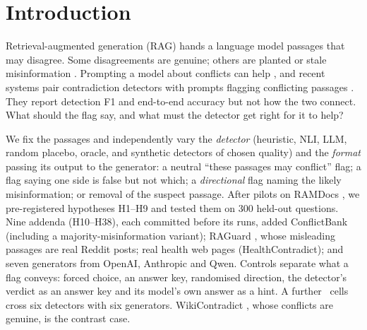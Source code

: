 \section{Introduction}

Retrieval-augmented generation (RAG) \citep{lewis2020rag} hands a language model passages that may disagree. Some
disagreements are genuine; others are planted or stale misinformation \citep{zou2025poisonedrag,wang2025madam}. Prompting a model about conflicts can help \citep{cattan2025conflicts}, and recent systems pair contradiction
detectors with prompts flagging conflicting passages \citep{wang2026conflictrag}. They report detection F1 and end-to-end accuracy but not how the two connect. What should the flag say, and what must the
detector get right for it to help?

We fix the passages and independently vary the \emph{detector} (heuristic, NLI, LLM, random placebo,
oracle, and synthetic detectors of chosen quality) and the \emph{format} passing its output to the generator: a
neutral ``these passages may conflict'' flag; a flag saying one side is false but not which; a
\emph{directional} flag naming the likely misinformation; or removal of the suspect passage. After pilots on
RAMDocs \citep{wang2025madam}, we pre-registered hypotheses H1--H9 and tested them on 300 held-out questions.
Nine addenda (H10--H38), each committed before its runs, added ConflictBank \citep{su2024conflictbank}
(including a majority-misinformation variant); RAGuard \citep{zeng2025raguard}, whose
misleading passages are real Reddit posts; real health web pages (HealthContradict); and seven generators from OpenAI, Anthropic and Qwen. Controls separate what a
flag conveys: forced choice, an answer key, randomised direction, the detector's verdict as an answer key and its model's own answer as
a hint. A further \hTwentyFourCells\ cells cross six detectors with six generators. WikiContradict \citep{hou2024wikicontradict}, whose conflicts are genuine, is the contrast case.

